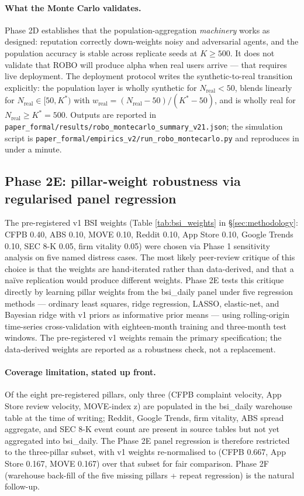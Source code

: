 \documentclass[11pt,a4paper]{article}
\begin{document}
\paragraph{What the Monte Carlo validates.} Phase 2D establishes that the population-aggregation \emph{machinery} works as designed: reputation correctly down-weights noisy and adversarial agents, and the population accuracy is stable across replicate seeds at $K \ge 500$. It does not validate that ROBO will produce alpha when real users arrive --- that requires live deployment. The deployment protocol writes the synthetic-to-real transition explicitly: the population layer is wholly synthetic for $N_{\text{real}} < 50$, blends linearly for $N_{\text{real}} \in [50, K^*)$ with $w_{\text{real}} = (N_{\text{real}} - 50)/(K^* - 50)$, and is wholly real for $N_{\text{real}} \ge K^* = 500$. Outputs are reported in \texttt{paper\_formal/results/robo\_montecarlo\_summary\_v21.json}; the simulation script is \texttt{paper\_formal/empirics\_v2/run\_robo\_montecarlo.py} and reproduces in under a minute.

\subsection{Phase 2E: pillar-weight robustness via regularised panel regression}\label{sec:results_weight_learning}

The pre-registered v1 BSI weights (Table \ref{tab:bsi_weights} in §\ref{sec:methodology}: CFPB 0.40, ABS 0.10, MOVE 0.10, Reddit 0.10, App Store 0.10, Google Trends 0.10, SEC 8-K 0.05, firm vitality 0.05) were chosen via Phase 1 sensitivity analysis on five named distress cases. The most likely peer-review critique of this choice is that the weights are hand-iterated rather than data-derived, and that a naïve replication would produce different weights. Phase 2E tests this critique directly by learning pillar weights from the bsi\_daily panel under five regression methods --- ordinary least squares, ridge regression, LASSO, elastic-net, and Bayesian ridge with v1 priors as informative prior means --- using rolling-origin time-series cross-validation with eighteen-month training and three-month test windows. The pre-registered v1 weights remain the primary specification; the data-derived weights are reported as a robustness check, not a replacement.

\paragraph{Coverage limitation, stated up front.} Of the eight pre-registered pillars, only three (CFPB complaint velocity, App Store review velocity, MOVE-index z) are populated in the bsi\_daily warehouse table at the time of writing; Reddit, Google Trends, firm vitality, ABS spread aggregate, and SEC 8-K event count are present in source tables but not yet aggregated into bsi\_daily. The Phase 2E panel regression is therefore restricted to the three-pillar subset, with v1 weights re-normalised to (CFPB 0.667, App Store 0.167, MOVE 0.167) over that subset for fair comparison. Phase 2F (warehouse back-fill of the five missing pillars + repeat regression) is the natural follow-up.
\end{document}
